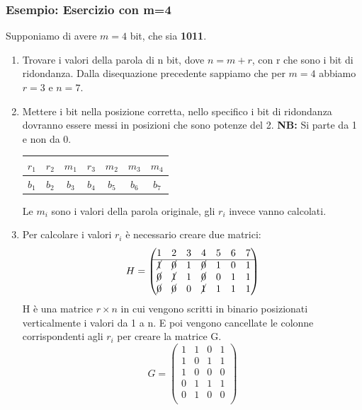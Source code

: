 \documentclass{article}
\begin{document}
\subsubsection{Esempio: Esercizio con m=4}
Supponiamo di avere $m = 4$ bit, che sia \textbf{1011}.
\begin{enumerate}
    \item Trovare i valori della parola di n bit, dove $n = m + r$, con r che sono i bit di ridondanza. Dalla disequazione precedente sappiamo che per $m = 4$ abbiamo $r = 3$ e $n = 7$.
    \item Mettere i bit nella posizione corretta, nello specifico i bit di ridondanza dovranno essere messi in posizioni che sono potenze del 2. \textbf{NB:} Si parte da 1 e non da 0.
    \begin{center}
    \begin{tabular}{|c|c|c|c|c|c|c|}
        \hline
        $r_1$ & $r_2$ & $m_1$ & $r_3$ & $m_2$ & $m_3$ & $m_4$ \\
        \hline 
        \hline
        $b_1$ & $b_2$ & $b_3$ & $b_4$ & $b_5$ & $b_6$ & $b_7$ \\
        \hline
    \end{tabular}
    \end{center}
    Le $m_i$ sono i valori della parola originale, gli $r_i$ invece vanno calcolati.
    \item Per calcolare i valori $r_i$ è necessario creare due matrici:
    \[H = \begin{pmatrix}
            1 & 2 & 3 & 4 & 5 & 6 & 7\\
            \hline
            \cancel{1} & \cancel{0} & 1 & \cancel{0} & 1 & 0 & 1 \\
            \cancel{0} & \cancel{1} & 1 & \cancel{0} & 0 & 1 & 1 \\
            \cancel{0} & \cancel{0} & 0 & \cancel{1} & 1 & 1 & 1 \\
          \end{pmatrix}
    \] 
    H è una matrice $r \times n$ in cui vengono scritti in binario posizionati verticalmente i valori da 1 a n. E poi vengono cancellate le colonne corrispondenti agli $r_i$ per creare la matrice G.
    \[G = \begin{pmatrix}
            1 & 1 & 0 & 1 \\
            1 & 0 & 1 & 1 \\
            1 & 0 & 0 & 0 \\
            0 & 1 & 1 & 1 \\
            0 & 1 & 0 & 0 \\

\end{pmatrix}\]
\end{enumerate}
\end{document}
